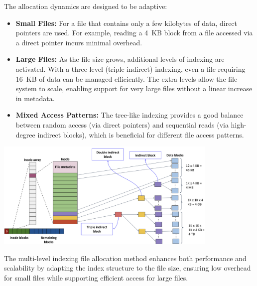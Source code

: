 The allocation dynamics are designed to be adaptive:

\begin{itemize}
    \item \textbf{Small Files:} For a file that contains only a few kilobytes of data, direct pointers are used. For example, reading a 4~KB block from a file accessed via a direct pointer incurs minimal overhead.
    
    \item \textbf{Large Files:} As the file size grows, additional levels of indexing are activated. With a three-level (triple indirect) indexing, even a file requiring 16~KB of data can be managed efficiently. The extra levels allow the file system to scale, enabling support for very large files without a linear increase in metadata.
    
    \item \textbf{Mixed Access Patterns:} The tree-like indexing provides a good balance between random access (via direct pointers) and sequential reads (via high-degree indirect blocks), which is beneficial for different file access patterns.
\end{itemize}

\begin{center}
  \includegraphics[width=0.8\textwidth]{chapters/L7/images/multi.png}
\end{center}
The multi-level indexing file allocation method enhances both performance and scalability by adapting the index structure to the file size, ensuring low overhead for small files while supporting efficient access for large files.
